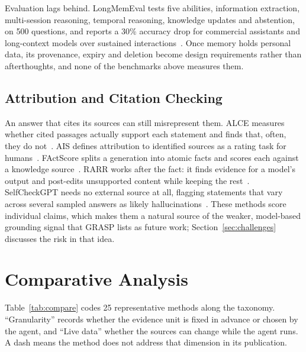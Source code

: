 \documentclass[pdflatex,sn-mathphys-num]{sn-jnl}%
\begin{document}
Evaluation lags behind. LongMemEval tests five abilities, information extraction, multi-session reasoning, temporal reasoning, knowledge updates and abstention, on 500 questions, and reports a 30\% accuracy drop for commercial assistants and long-context models over sustained interactions~\cite{wu2025longmemeval}. Once memory holds personal data, its provenance, expiry and deletion become design requirements rather than afterthoughts, and none of the benchmarks above measures them.

\subsection{Attribution and Citation Checking}
An answer that cites its sources can still misrepresent them. ALCE measures whether cited passages actually support each statement and finds that, often, they do not~\cite{gao2023alce}. AIS defines attribution to identified sources as a rating task for humans~\cite{rashkin2023ais}. FActScore splits a generation into atomic facts and scores each against a knowledge source~\cite{min2023factscore}. RARR works after the fact: it finds evidence for a model's output and post-edits unsupported content while keeping the rest~\cite{gao2023rarr}. SelfCheckGPT needs no external source at all, flagging statements that vary across several sampled answers as likely hallucinations~\cite{manakul2023selfcheckgpt}. These methods score individual claims, which makes them a natural source of the weaker, model-based grounding signal that GRASP lists as future work; Section~\ref{sec:challenges} discusses the risk in that idea.

\section{Comparative Analysis}
\label{sec:compare}

Table~\ref{tab:compare} codes 25 representative methods along the taxonomy. ``Granularity'' records whether the evidence unit is fixed in advance or chosen by the agent, and ``Live data'' whether the sources can change while the agent runs. A dash means the method does not address that dimension in its publication.
\end{document}
